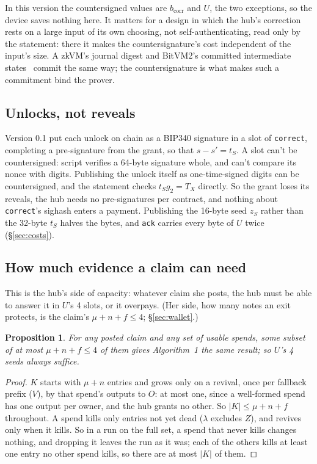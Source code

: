 \documentclass[11pt]{article}
\theoremstyle{plain}
\newtheorem{proposition}{Proposition}
\theoremstyle{definition}
\newcommand{\bcorr}{b_{\mathrm{corr}}}
\newcommand{\tx}[1]{\texttt{#1}}
\begin{document}
In this version the countersigned values are $\bcorr$ and $U$, the two
exceptions, so the device saves nothing here. It matters for a design
in which the hub's correction rests on a large input of its own
choosing, not self-authenticating, read only by the statement: there
it makes the countersignature's cost independent of the input's size.
A zkVM's journal digest and BitVM2's committed intermediate
states~\cite{bitvm2} commit the same way; the countersignature is what
makes such a commitment bind the prover.

\subsection{Unlocks, not reveals}\label{sec:unlocks}

Version 0.1 put each unlock on chain as a BIP340 signature in a slot of
\tx{correct}, completing a pre-signature from the grant, so that $s - s'
= t_S$. A slot can't be countersigned: script verifies a 64-byte
signature whole, and can't compare its nonce with digits. Publishing
the unlock itself as one-time-signed digits can be countersigned, and
the statement checks $t_S g_2 = T_X$ directly. So the grant loses its
reveals, the hub needs no pre-signatures per contract, and nothing
about \tx{correct}'s sighash enters a payment. Publishing the 16-byte
seed $z_S$ rather than the 32-byte $t_S$ halves the bytes, and \tx{ack}
carries every byte of $U$ twice (\S\ref{sec:costs}).

\subsection{How much evidence a claim can need}\label{sec:volume}

This is the hub's side of capacity: whatever claim she posts, the hub
must be able to answer it in $U$'s 4 slots, or it overpays. (Her side,
how many notes an exit protects, is the claim's $\mu + n + f \le 4$;
\S\ref{sec:wallet}.)

\begin{proposition}\label{prop:volume}
For any posted claim and any set of usable spends, some subset of at
most $\mu + n + f \le 4$ of them gives Algorithm~1 the same result; so
$U$'s 4 seeds always suffice.
\end{proposition}
\begin{proof}
$K$ starts with $\mu + n$ entries and grows only on a revival, once per
fallback prefix ($V$), by that spend's outputs to $O$: at most one, since
a well-formed spend has one output per owner, and the hub grants no
other. So $|K| \le \mu + n + f$ throughout. A spend kills only entries
not yet dead ($\lambda$ excludes $Z$), and revives only when it kills.
So in a run on the full set, a spend that never kills changes nothing,
and dropping it leaves the run as it was; each of the others kills at
least one entry no other spend kills, so there are at most $|K|$ of
them.
\end{proof}
\end{document}

